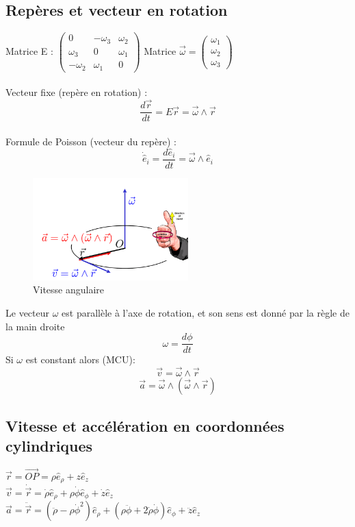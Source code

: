 \documentclass{article}
\begin{document}
\subsection{Repères et vecteur en rotation}
Matrice E :
\(\begin{pmatrix}
    0 & -\omega_3 & \omega_2 \\
    \omega_3 & 0 & \omega_1 \\
    -\omega_2 & \omega_1 & 0
\end{pmatrix} \) \qquad Matrice \(  \overrightarrow{\omega} = \begin{pmatrix}
    \omega_1 \\
    \omega_2 \\
    \omega_3
\end{pmatrix}\) \\\\
Vecteur fixe (repère en rotation) : \[ \frac{d\overrightarrow{r}}{dt} = E\overrightarrow{r} = \overrightarrow{\omega} \wedge \overrightarrow{r} \]\\
Formule de Poisson (vecteur du repère) : \[  \dot{\hat{e}}_i = \frac{d\hat{e}_i}{dt} = \overrightarrow{\omega} \wedge \hat{e}_i \]
\begin{figure}[htp]
    \centering
    \includegraphics[width=6cm]{Images/vitesse angulaire.png}
    \caption{Vitesse angulaire}
    \label{fig:angu}
\end{figure}
\newline Le vecteur \( \omega \) est parallèle à l'axe de rotation, et son sens est donné par la règle de la main droite
\[ \omega = \frac{d\phi}{dt}\]
Si $\omega$ est constant alors (MCU):
\[ \overrightarrow{v} = \overrightarrow{\omega} \wedge \overrightarrow{r}  \]
\[ \overrightarrow{a} =  \overrightarrow{\omega} \wedge (\overrightarrow{\omega} \wedge \overrightarrow{r}) \] \newpage
\subsection{Vitesse et accélération en coordonnées cylindriques}
\( \overrightarrow{r} = \overrightarrow{OP} = \rho\hat{e}_{\rho} + z\hat{e}_z \) \\
\( \overrightarrow{v} = \dot{\overrightarrow{r}} = \dot{\rho}\hat{e}_{\rho} + \rho\dot{\phi}\hat{e}_{\phi} + \dot{z}\hat{e}_z \) \\
\( \overrightarrow{a} = \ddot{\overrightarrow{r}} = (\ddot{\rho} - \rho\dot{\phi}^2)\hat{e}_{\rho} + (\rho\ddot{\phi} + 2\dot{\rho}\dot{\phi})\hat{e}_{\phi} + \ddot{z}\hat{e}_z \) \\
\end{document}
